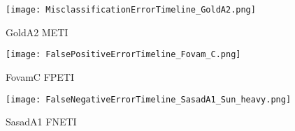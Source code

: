 \clearpage
\begin{sidewaysfigure}[h!]
	\centering
	\captionsetup{width=0.9\textwidth,aboveskip=10pt}
	\texttt{[image: MisclassificationErrorTimeline\_GoldA2.png]}
	\caption[Misclassification Error Timeline]{GoldA2 METI}
	\vspace{0.5cm}
	\centering
	\captionsetup{width=0.9\textwidth,aboveskip=10pt}
	\texttt{[image: FalsePositiveErrorTimeline\_Fovam\_C.png]}
	\caption[False Positive Error Timeline]{FovamC FPETI}
	\vspace{0.5cm}
	\centering
	\captionsetup{width=0.9\textwidth,aboveskip=10pt}
	\texttt{[image: FalseNegativeErrorTimeline\_SasadA1\_Sun\_heavy.png]}
	\caption[False Negative Error Timeline]{SasadA1 FNETI}
\end{sidewaysfigure}
